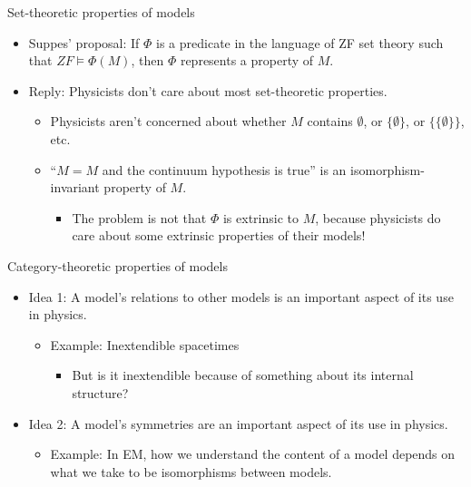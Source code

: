 \documentclass{beamer}
\begin{document}
\begin{frame}{Set-theoretic properties of models}

  \begin{itemize}
  \item Suppes' proposal: If $\Phi$ is a predicate in the language of
    ZF set theory such that $ZF\vDash\Phi (M)$, then $\Phi$ represents
    a property of $M$.
  \item Reply: Physicists don't care about most set-theoretic
    properties.
    \begin{itemize}
    \item Physicists aren't concerned about whether $M$ contains
      $\emptyset$, or $\{ \emptyset \}$, or $\{ \{ \emptyset \} \}$,
      etc.
    \item ``$M=M$ and the continuum hypothesis is true'' is an
      isomorphism-invariant property of $M$.
      \begin{itemize} \item The problem is not that $\Phi$ is
        extrinsic to $M$, because physicists do care about some
        extrinsic properties of their models!
      \end{itemize}
    \end{itemize}
  \end{itemize}

\end{frame}

\begin{frame}{Category-theoretic properties of models}

  \begin{itemize}
  \item Idea 1: A model's relations to other models is an important
    aspect of its use in physics.

    \begin{itemize}
    \item Example: Inextendible spacetimes
      \begin{itemize}
      \item But is it inextendible because of something about its
        internal structure?
      \end{itemize}
    \end{itemize}

  \item Idea 2: A model's symmetries are an important aspect of its
    use in physics.

    \begin{itemize}
    \item Example: In EM, how we understand the content of a model
      depends on what we take to be isomorphisms between models.
    \end{itemize}
  \end{itemize}

\end{frame}
\end{document}
